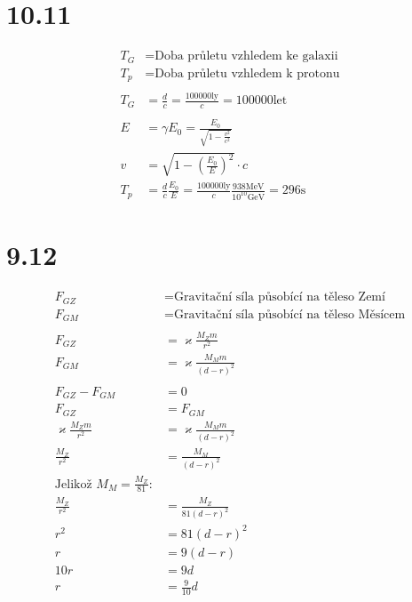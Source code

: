 \documentclass{article}
\begin{document}
   \section*{10.11}
   $$
   \begin{aligned}
       T_G &= \text{Doba průletu vzhledem ke galaxii}\\
       T_p &= \text{Doba průletu vzhledem k protonu}\\
       \\
       T_G &= \frac{d}{c} = \frac{100000\si{\text{ly}}}{c} = 100000\si{\text{let}}\\
       \\
       E &= \gamma E_0 = \frac{E_0}{\sqrt{1-\frac{v^2}{c^2}}}\\
       v &= \sqrt{1-(\frac{E_0}{E})^2}\cdot c\\
       T_p &= \frac{d}{c}\frac{E_0}{E} = \frac{100000\si{\text{ly}}}{c} \frac{938 \si{\mega\electronvolt}}{10^{10} \si{\giga\electronvolt}} = 296 \si{\second}
   \end{aligned}
   $$
   \section*{9.12}
   $$
   \begin{aligned}
       F_{GZ} &= \text{Gravitační síla působící na těleso Zemí}\\
       F_{GM} &= \text{Gravitační síla působící na těleso Měsícem}\\
       \\
       F_{GZ} &= \varkappa \frac{M_Z m}{r^2}\\
       F_{GM} &= \varkappa \frac{M_M m}{(d-r)^2}\\
       \\
       F_{GZ}-F_{GM} &= 0\\
       F_{GZ} &= F_{GM}\\
       \varkappa \frac{M_Z m}{r^2} &= \varkappa \frac{M_M m}{(d-r)^2}\\
       \frac{M_Z}{r^2} &= \frac{M_M}{(d-r)^2}\\
       \text{Jelikož $M_M = \frac{M_Z}{81}$}:\\
       \frac{M_Z}{r^2} &= \frac{M_Z}{81(d-r)^2}\\
       r^2 &= 81(d-r)^2\\
       r &= 9(d-r)\\
       10r &= 9d\\
       r &= \frac{9}{10}d
   \end{aligned}
   $$
\end{document}
